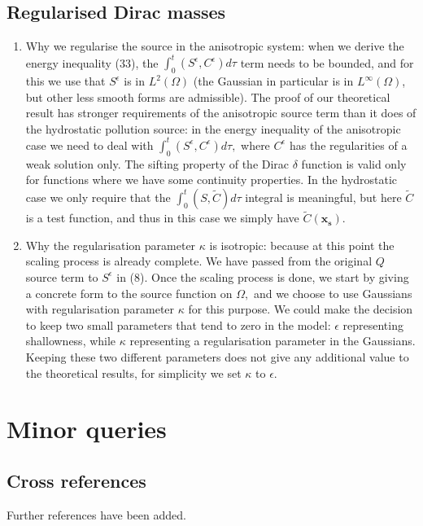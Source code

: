 \documentclass[11pt]{article}
\begin{document}
\subsection{Regularised Dirac masses}

\begin{enumerate}

  \item Why we regularise the source in the anisotropic system: when we derive the energy inequality (33), the $\int_0^t (S^\epsilon, C^\epsilon) d \tau$ term needs to be bounded, and for this we use that $S^\epsilon$ is in $L^2(\Omega)$ (the Gaussian in particular is in $L^\infty(\Omega)$, but other less smooth forms are admissible). The proof of our theoretical result has stronger requirements of the anisotropic source term than it does of the hydrostatic pollution source: in the energy inequality of the anisotropic case we need to deal with $\int_0^t (S^\epsilon, C^\epsilon) d \tau,$ where $C^\epsilon$ has the regularities of a weak solution only. The sifting property of the Dirac $\delta$ function is valid only for functions where we have some continuity properties. In the hydrostatic case we only require that the $\int_0^t (S, \tilde{C}) d \tau$ integral is meaningful, but here $\tilde{C}$ is a test function, and thus in this case we simply have $\tilde{C}(\mathbf{x_s}).$
  
  \item Why the regularisation parameter $\kappa$ is isotropic: because at this point the scaling process is already complete. We have passed from the original $Q$ source term to $S^\epsilon$ in (8). Once the scaling process is done, we start by giving a concrete form to the source function on $\Omega,$ and we choose to use Gaussians with regularisation parameter $\kappa$ for this purpose. We could make the decision to keep two small parameters that tend to zero in the model: $\epsilon$ representing shallowness, while $\kappa$ representing a regularisation parameter in the Gaussians. Keeping these two different parameters does not give any additional value to the theoretical results, for simplicity we set $\kappa$ to $\epsilon.$

\end{enumerate}

\section{Minor queries}

\subsection{Cross references}
Further references have been added.
\end{document}
